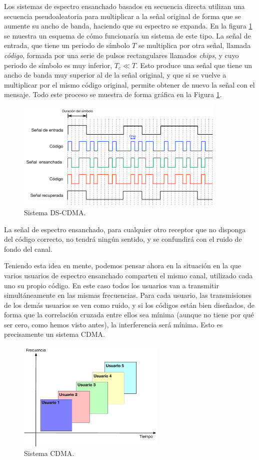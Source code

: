 \documentclass[es,apuntes]{uah}
\begin{document}
Los sistemas de espectro ensanchado basados en secuencia directa utilizan una secuencia pseudoaleatoria para multiplicar a la señal original de forma que se aumente su ancho de banda, haciendo que su espectro se expanda. En la figura \ref{fig:DS-CDMA} se muestra un esquema de cómo funcionaría un sistema de este tipo. La señal de entrada, que tiene un periodo de símbolo $T$ se multiplica por otra señal, llamada \emph{código}, formada por una serie de pulsos rectangulares llamados \emph{chips}, y cuyo periodo de símbolo es muy inferior, $T_c \ll T$. Esto produce una señal que tiene un ancho de banda muy superior al de la señal original, y que si se vuelve a multiplicar por el mismo código original, permite obtener de nuevo la señal con el mensaje. Todo este proceso se muestra de forma gráfica en la Figura \ref{fig:DS-CDMA}.


\begin{figure}[h!]
	\centering\includegraphics[width=10cm]{./Figuras/DS-CDMA}
	\caption{Sistema DS-CDMA.}
	\label{fig:DS-CDMA}
\end{figure}

La señal de espectro ensanchado, para cualquier otro receptor que no disponga del código correcto, no tendrá ningún sentido, y se confundirá con el ruido de fondo del canal. 

Teniendo esta idea en mente, podemos pensar ahora en la situación en la que varios usuarios de espectro ensanchado comparten el mismo canal, utilizado cada uno su propio código. En este caso todos los usuarios van a transmitir simultáneamente en las mismas frecuencias. Para cada usuario, las transmisiones de los demás usuarios se ven como ruido, y si los códigos están bien diseñados, de forma que la correlación cruzada entre ellos sea mínima (aunque no tiene por qué ser cero, como hemos visto antes), la interferencia será mínima. Esto es precisamente un sistema CDMA. 


\begin{figure}[h!]
	\centering\includegraphics[width=7cm]{./Figuras/CDMA}
	\caption{Sistema CDMA.}
	\label{fig:CDMA}
\end{figure}
\end{document}
